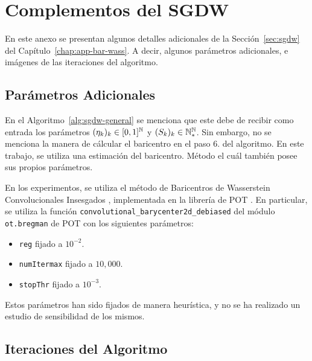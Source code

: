 \chapter{Complementos del SGDW}\label{chap:complemento-sgdw}  %


En este anexo se presentan algunos detalles adicionales de la Sección~\ref{sec:sgdw} del Capítulo~\ref{chap:app-bar-wass}. A decir, algunos parámetros adicionales, e imágenes de las iteraciones del algoritmo.

\section{Parámetros Adicionales}\label{sec:compl-sgdw-params-adicional}  %


En el Algoritmo~\ref{alg:sgdw-general} se menciona que este debe de recibir como entrada los parámetros $(\eta_k)_k \in [0, 1]^{\mathbb{N}}$ y $(S_k)_k \in \mathbb{N}_\ast^{\mathbb{N}}$. Sin embargo, no se menciona la manera de cálcular el baricentro en el paso 6. del algoritmo. En este trabajo, se utiliza una estimación del baricentro. Método el cuál también posee sus propios parámetros.

En los experimentos, se utiliza el método de Baricentros de Wasserstein Convolucionales Insesgados \cite{janati2020debiased}, implementada en la librería de POT \cite{flamary2021pot}. En particular, se utiliza la función \texttt{convolutional\_barycenter2d\_debiased} del módulo \texttt{ot.bregman} de POT con los siguientes parámetros:
\begin{itemize}
    \item \texttt{reg} fijado a $10^{-2}$.
    \item \texttt{numItermax} fijado a $10,000$.
    \item \texttt{stopThr} fijado a $10^{-3}$.
\end{itemize}

Estos parámetros han sido fijados de manera heurística, y no se ha realizado un estudio de sensibilidad de los mismos.

\section{Iteraciones del Algoritmo}\label{sec:compl-sgdw-iters}  %

